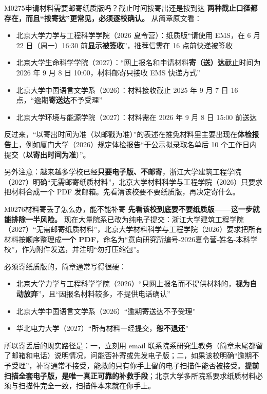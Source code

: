 \begin{qa}{M0275}{申请材料需要邮寄纸质版吗？截止时间按寄出还是按到达}
\textbf{两种截止口径都存在，而且“按寄达”更常见，必须逐校确认。} 从简章原文看：

\begin{itemize}
  \item 北京大学力学与工程科学学院（2026 夏令营）：纸质版“请使用 EMS，在 6 月 22 日（周一）16:30 前\textbf{显示被签收}”，推荐信需在 16 点前快递被签收
  \item 北京大学生命科学学院（2027）：“网上报名和申请材料\textbf{寄（送）达}截止时间为 2026 年 9 月 8 日 10:00，材料邮寄只接收 EMS 快递方式”
  \item 北京大学中国语言文学系（2026）：材料接收截止 2025 年 9 月 7 日 16 点，“逾期\textbf{寄送达}不予受理”
  \item 北京大学环境与能源学院（2027）：材料需在 2026 年 9 月 8 日 15:00 前送达
\end{itemize}

反过来，“以寄出时间为准（以邮戳为准）”的表述在推免材料里主要出现在\textbf{体检报告}上，例如厦门大学（2026）规定体检报告“于公示拟录取名单后 10 个工作日内提交（\textbf{以寄出时间为准}）”。

另外注意：越来越多学校已经\textbf{只要电子版、不邮寄}，浙江大学建筑工程学院（2027）明确“无需邮寄纸质材料”，北京大学材料科学与工程学院（2026）只要求把材料合成一个 PDF 发邮箱。先看清该校要不要纸质版，再决定寄什么。
\end{qa}

\begin{qa}{M0276}{材料寄丢了怎么办，能不能补寄}
\textbf{先看该校到底要不要纸质版——这一步就能排除一半风险。} 现在大量院系已改为纯电子提交：浙江大学建筑工程学院（2027）“无需邮寄纸质材料”，北京大学材料科学与工程学院（2026）要求把所有材料按顺序整理成\textbf{一个 PDF}，命名为“意向研究所编号-2026夏令营-姓名-本科学校”，作为附件发送，并注明“勿打压缩包”。

必须寄纸质版的，简章通常写得很硬：

\begin{itemize}
  \item 北京大学力学与工程科学学院（2026）“只网上报名而不提供材料的，\textbf{视为自动放弃}”，且“因报名材料较多，不提供电话确认”
  \item 北京大学中国语言文学系（2026）“逾期寄送达不予受理”
  \item 华北电力大学（2027）“所有材料一经提交，\textbf{恕不退还}”
\end{itemize}

所以寄丢后的现实路径是：一，立刻用 email 联系院系研究生教务（简章末尾都留了邮箱和电话）说明情况，问能否补寄或先发电子版；二，如果该校明确“逾期不予受理”，补寄通常不接受，能救的只有你手上留的电子扫描件能否被接受。\textbf{提前扫描全套电子版，是唯一真正可靠的补救手段}；北京大学多所院系要求纸质材料必须与扫描件完全一致，扫描件本来就在你手上。
\end{qa}


